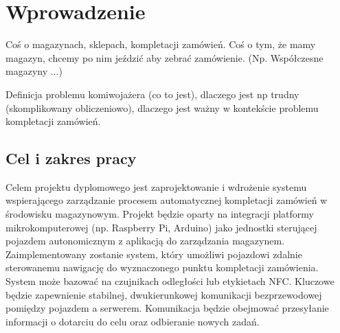 
\chapter{Wprowadzenie}
\label{cha:wprowadzenie}

Coś o magazynach, sklepach, kompletacji zamówień. Coś o tym, że mamy magazyn, chcemy po nim jeździć aby zebrać zamówienie. (Np. Współczesne magazyny ...)

Definicja problemu komiwojażera (co to jest), dlaczego jest np trudny (skomplikowany obliczeniowo), dlaczego jest ważny w kontekście problemu kompletacji zamówień.

\section{Cel i zakres pracy}
\label{sec:celePracy}

Celem projektu dyplomowego jest zaprojektowanie i wdrożenie systemu wspierającego zarządzanie procesem automatycznej kompletacji zamówień w środowisku magazynowym. Projekt będzie oparty na integracji platformy mikrokomputerowej (np. Raspberry Pi, Arduino) jako jednostki sterującej pojazdem autonomicznym z aplikacją do zarządzania magazynem. Zaimplementowany zostanie system, który umożliwi pojazdowi zdalnie sterowanemu nawigację do wyznaczonego punktu kompletacji zamówienia. System może bazować na czujnikach odległości lub etykietach NFC. Kluczowe będzie zapewnienie stabilnej, dwukierunkowej komunikacji bezprzewodowej pomiędzy pojazdem a serwerem. Komunikacja będzie obejmować przesyłanie informacji o dotarciu do celu oraz odbieranie nowych zadań.
